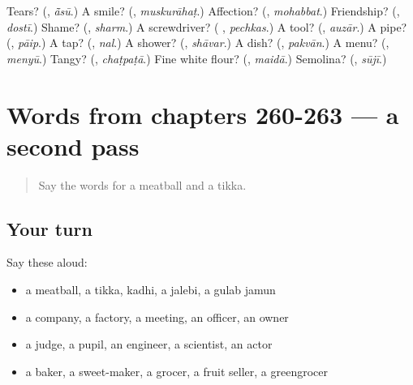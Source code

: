 \begin{tcolorbox}[breakable,colback=teal!4,colframe=teal!35!black,title={Before you move on}]
Tears? (\textbf{}, \emph{ā̃sū}.) A smile? (\textbf{}, \emph{muskurāhaṭ}.) Affection? (\textbf{}, \emph{mohabbat}.) Friendship? (\textbf{}, \emph{dostī}.) Shame? (\textbf{}, \emph{sharm}.) A screwdriver? (\textbf{ }, \emph{pechkas}.) A tool? (\textbf{}, \emph{auzār}.) A pipe? (\textbf{}, \emph{pāip}.) A tap? (\textbf{}, \emph{nal}.) A shower? (\textbf{}, \emph{shāvar}.) A dish? (\textbf{}, \emph{pakvān}.) A menu? (\textbf{}, \emph{menyū}.) Tangy? (\textbf{}, \emph{chaṭpaṭā}.) Fine white flour? (\textbf{}, \emph{maidā}.) Semolina? (\textbf{}, \emph{sūjī}.)
\end{tcolorbox}
\section[(dialogue)]{Words from chapters 260-263 — a second pass}

\label{lesson:UR-R263-second-pass-words-from-chapters-260-263}



\begin{quote}
Say the words for a meatball and a tikka.
\end{quote}

\subsection*{Your turn}
Say these aloud:

\begin{itemize}
\raggedright
  \item a meatball, a tikka, kadhi, a jalebi, a gulab jamun
  \item a company, a factory, a meeting, an officer, an owner
  \item a judge, a pupil, an engineer, a scientist, an actor
  \item a baker, a sweet-maker, a grocer, a fruit seller, a greengrocer
\end{itemize}

